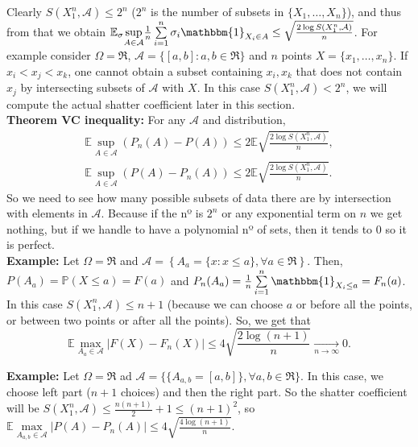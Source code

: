 \documentclass[11pt, english]{article}
\begin{document}
 Clearly $S(X_1^n,\mathcal{A})\leq 2^n$ ($2^n$ is the number of subsets in $\{X_1,\dots,X_n\}$), and thus from that we obtain $\mathbb{E}_{\sigma}\underset{A\in\mathcal{A}}{\sup}\frac{1}{n}\sum\limits_{i=1}^n\sigma_i\mathbbm{1}_{X_i\in A}\leq \sqrt{\frac{2\log S(X_1^n,\mathcal{A})}{n}}$.
 For example consider $\Omega=\Re$, $\mathcal{A}=\{[a,b]:a,b\in\Re\}$ and $n$ points $X=\{x_1,\dots,x_n\}$. If $x_i<x_j<x_k$, one cannot obtain a subset containing $x_i, x_k$ that does not contain $x_j$ by intersecting subsets of $\mathcal{A}$ with $X$. In this case $S(X_1^n,\mathcal{A})<2^n$, we will compute the actual shatter coefficient later in this section.\\
 
 \textbf{Theorem VC inequality:} For any $\mathcal{A}$ and distribution, \begin{align}
 	\mathbb{E}\underset{A\in\mathcal{A}}{\sup}(P_n(A)-P(A))\leq 2\mathbb{E}\sqrt{\frac{2\log S(X_1^n,\mathcal{A})}{n}},\\
 	\mathbb{E}\underset{A\in\mathcal{A}}{\sup}(P(A)-P_n(A))\leq 2\mathbb{E}\sqrt{\frac{2\log S(X_1^n,\mathcal{A})}{n}}.
 \end{align}
 So we need to see how many possible subsets of data there are by intersection with elements in $\mathcal{A}$. Because if the nº is $2^n$ or any exponential term on $n$ we get nothing, but if we handle to have a polynomial nº of sets, then it tends to 0 so it is perfect.\\
 
 \textbf{Example:}
 Let $\Omega= \Re$ and $\mathcal{A}=\left\{A_a=\{x: x\leq a\}, \forall a\in\Re\right\}$. Then, $P(A_a)=\mathbb{P}(X\leq a)=F(a)$ and $P_n(A_a)=\frac{1}{n}\sum\limits_{i=1}^n\mathbbm{1}_{X_i\leq a}=F_n(a)$. In this case $S(X_1^n,\mathcal{A})\leq n+1$ (because we can choose $a$ or before all the points, or between two points or after all the points). So, we get that 
 \begin{equation}
 	\mathbb{E}\underset{A_a\in\mathcal{A}}{\max}|F(X)-F_n(X)|\leq 4\sqrt{\frac{2\log(n+1)}{n}}\underset{n\rightarrow\infty}{\longrightarrow}0.
 \end{equation}
 
 \textbf{Example:} Let $\Omega=\Re$ ad $\mathcal{A}=\{\{A_{a,b}=[a,b]\},\forall a,b\in\Re \}$. In this case, we choose left part ($n+1$ choices) and then the right part. So the shatter coefficient will be $S(X_1^n,\mathcal{A})\leq\frac{n(n+1)}{2}+1\leq(n+1)^2$, so $\mathbb{E}\underset{A_{a,b}\in\mathcal{A}}{\max}|P(A)-P_n(A)|\leq4\sqrt{\frac{4\log(n+1)}{n}}$.\\
 
\end{document}
